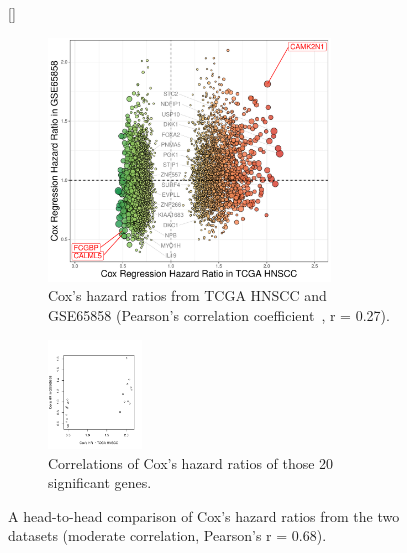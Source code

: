 \documentclass[
paper=landscape,
paper=160mm:90mm, %
fontsize=11pt, %
pagesize, %
parskip=half-, %
]{scrartcl} %
\theoremstyle{mythmstyle} %
\begin{document}
\begin{figure}[ht]

[\FBwidth]
{%
    
    \begin{subfigure}[c]{0.5\textwidth}
    \includegraphics[width=7.5cm]{RplotH2H_TCGA_GSE65858_CoxHR.pdf}
    \caption{Cox's hazard ratios from TCGA HNSCC and GSE65858 (Pearson's correlation coefficient~\cite{Schober2018}, r = 0.27).}
    \end{subfigure}
    \begin{subfigure}[t]{0.15\textwidth}
    \includegraphics[width=2.5cm]{Rplot20_correlation_TCGA_GSE65858_CoxHR.pdf}
    \caption{Correlations of Cox's hazard ratios of those 20 significant genes.}%
    \end{subfigure}    
}   
{    \caption{A head-to-head comparison of Cox's hazard ratios from the two datasets (moderate correlation, Pearson's r = 0.68).
    }}
\end{figure}
\end{document}
